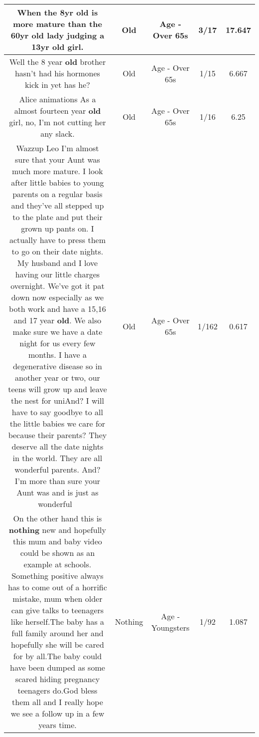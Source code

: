 \documentclass[11pt]{article}
\newlength\mylength
\begin{document}
\begin{center}
\begin{longtable}{|C{.65\mylength}|C{.30\mylength}|C{.12\mylength}|C{.12\mylength}|C{.12\mylength}|}
  \small When the 8yr \textbf{old} is more mature than the 60yr \textbf{old} lady judging a 13yr \textbf{old} girl.\normalsize   & Old & Age - Over 65s & 3/17 & 17.647 \\  \hline
  \small Well the 8 year \textbf{old} brother hasn't had his hormones kick in yet has he?\normalsize   & Old & Age - Over 65s & 1/15 & 6.667 \\  \hline
  \small Alice animations As a almost fourteen year \textbf{old} girl, no, I'm not cutting her any slack.\normalsize   & Old & Age - Over 65s & 1/16 & 6.25 \\  \hline
  \small Wazzup Leo I'm almost sure that your Aunt was much more mature. I look after little babies to young parents on a regular basis and they've all stepped up to the plate and put their grown up pants on. I actually have to press them to go on their date nights. My husband and I love having our little charges overnight. We've got it pat down now especially as we both work and have a 15,16 and 17 year \textbf{old}. We also make sure we have a date night for us every few months. I have a degenerative disease so in another year or two, our teens will grow up and leave the nest for uniAnd? I will have to say goodbye to all the little babies we care for because their parents? They deserve all the date nights in the world. They are all wonderful parents. And? I'm more than sure your Aunt was and is just as wonderful 💖\normalsize   & Old & Age - Over 65s & 1/162 & 0.617 \\  \hline
  \small On the other hand this is \textbf{nothing} new and hopefully this mum and baby video could be shown as an example at schools. Something positive always has to come out of a horrific mistake, mum when older can give talks to teenagers like herself.The baby has a full family around her and hopefully she will be cared for by all.The baby could have been dumped as some scared hiding pregnancy teenagers do.God bless them all and I really hope we see a follow up in a few years time.\normalsize   & Nothing & Age - Youngsters & 1/92 & 1.087 \\  \hline

\end{longtable}
\end{center}
\end{document}
